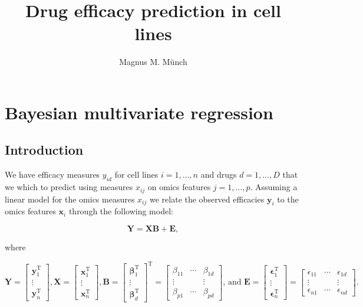 \documentclass[a4paper,hidelinks]{article}
\title{Drug efficacy prediction in cell lines}
\date{}
\author{Magnus M. M\"unch}
\newcommand{\bbeta}{\bm{\beta}}
\newcommand{\bepsilon}{\bm{\epsilon}}
\newcommand{\Y}{\mathbf{Y}}
\newcommand{\y}{\mathbf{y}}
\newcommand{\X}{\mathbf{X}}
\newcommand{\x}{\mathbf{x}}
\newcommand{\B}{\mathbf{B}}
\newcommand{\Em}{\mathbf{E}}
\newcommand{\0}{\bm{0}}
\newcommand{\tr}{^{\text{T}}}
\renewcommand{\(}{\left(}
\renewcommand{\)}{\right)}
\renewcommand{\[}{\left[}
\renewcommand{\]}{\right]}
\begin{document}
	\maketitle
	
	
\section{Bayesian multivariate regression}
\subsection{Introduction}

We have efficacy measures $y_{id}$ for cell lines $i=1,\dots, n$ and drugs $d=1,\dots,D$ that we which to predict using measures $x_{ij}$ on omics features $j=1,\dots, p$. Assuming a linear model for the omics measures $x_{ij}$ we relate the observed efficacies $\y_i$ to the omics features $\x_i$ through the following model:

$$
\Y = \X \B + \Em,
$$

where 

$$
\Y = \begin{bmatrix}
\y_1 \tr \\
\vdots \\
\y_n \tr
\end{bmatrix}, 
\X = \begin{bmatrix}
\x_1 \tr \\
\vdots \\
\x_n \tr
\end{bmatrix},
\B = \begin{bmatrix}
\bbeta_1 \tr \\ 
\vdots \\
\bbeta_d \tr
\end{bmatrix} \tr 
= \begin{bmatrix}
\beta_{11} & \cdots & \beta_{1d} \\
\vdots & & \vdots \\
\beta_{p1} & \cdots & \beta_{pd}
\end{bmatrix}\text{, and }
\Em = \begin{bmatrix}
\bepsilon_1 \tr \\
\vdots \\
\bepsilon_n \tr
\end{bmatrix}
= \begin{bmatrix}
\epsilon_{11} & \cdots & \epsilon_{1d} \\
\vdots & & \vdots \\
\epsilon_{n1} & \cdots & \epsilon_{nd}
\end{bmatrix}.
$$
\end{document}
